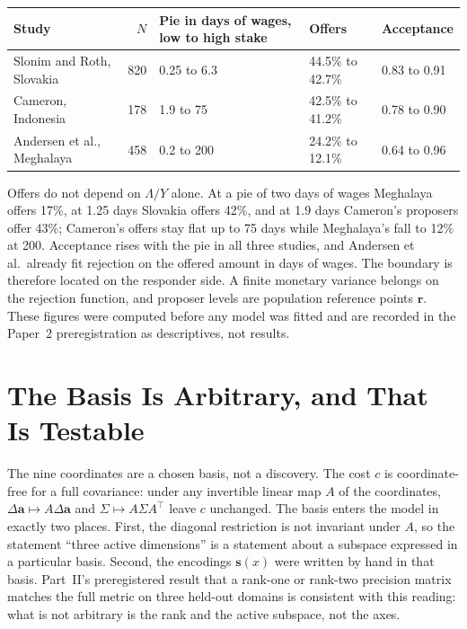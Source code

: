 \documentclass[11pt,onecolumn]{IEEEtran}
\begin{document}
\begin{center}\small
\begin{tabular}{@{}l r l l l@{}}
\toprule
Study & $N$ & Pie in days of wages, low to high stake & Offers & Acceptance \\
\midrule
Slonim and Roth, Slovakia \cite{slonim1998} & 820 & 0.25 to 6.3 & 44.5\% to 42.7\% & 0.83 to 0.91 \\
Cameron, Indonesia \cite{cameron1999} & 178 & 1.9 to 75 & 42.5\% to 41.2\% & 0.78 to 0.90 \\
Andersen et al., Meghalaya \cite{andersen2011} & 458 & 0.2 to 200 & 24.2\% to 12.1\% & 0.64 to 0.96 \\
\bottomrule
\end{tabular}
\end{center}

Offers do not depend on $\Lambda/Y$ alone.
At a pie of two days of wages Meghalaya offers 17\%, at 1.25 days Slovakia offers 42\%, and at 1.9 days Cameron's proposers offer 43\%; Cameron's offers stay flat up to 75 days while Meghalaya's fall to 12\% at 200.
Acceptance rises with the pie in all three studies, and Andersen et al.\ already fit rejection on the offered amount in days of wages.
The boundary is therefore located on the responder side.
A finite monetary variance belongs on the rejection function, and proposer levels are population reference points $\mathbf r$.
These figures were computed before any model was fitted and are recorded in the Paper~2 preregistration as descriptives, not results.

\section{The Basis Is Arbitrary, and That Is Testable}
\label{sec:basis}

The nine coordinates are a chosen basis, not a discovery.
The cost $c$ is coordinate-free for a full covariance: under any invertible linear map $A$ of the coordinates, $\Delta\mathbf a\mapsto A\Delta\mathbf a$ and $\Sigma\mapsto A\Sigma A^{\top}$ leave $c$ unchanged.
The basis enters the model in exactly two places.
First, the diagonal restriction is not invariant under $A$, so the statement ``three active dimensions'' is a statement about a subspace expressed in a particular basis.
Second, the encodings $\mathbf s(x)$ were written by hand in that basis.
Part~II's preregistered result that a rank-one or rank-two precision matrix matches the full metric on three held-out domains is consistent with this reading: what is not arbitrary is the rank and the active subspace, not the axes.
\end{document}
